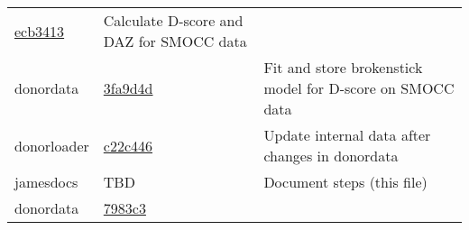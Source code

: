 \documentclass[]{book}
\begin{document}
\begin{longtable}[]{@{}lll@{}}
\begin{minipage}[t]{0.29\columnwidth}
\href{https://github.com/stefvanbuuren/donordata/commit/ecb3413b115c3193135b1af118597768b083dc41}{ecb3413}\strut
\end{minipage} & \begin{minipage}[t]{0.36\columnwidth}\raggedright
Calculate D-score and DAZ for SMOCC data\strut
\end{minipage}\tabularnewline
\begin{minipage}[t]{0.26\columnwidth}\raggedright
donordata\strut
\end{minipage} & \begin{minipage}[t]{0.29\columnwidth}\raggedright
\href{https://github.com/stefvanbuuren/donordata/commit/3fa9d4de347d09ccff32a887cf6bd8dadfdfaeb6}{3fa9d4d}\strut
\end{minipage} & \begin{minipage}[t]{0.36\columnwidth}\raggedright
Fit and store brokenstick model for D-score on SMOCC data\strut
\end{minipage}\tabularnewline
\begin{minipage}[t]{0.26\columnwidth}\raggedright
donorloader\strut
\end{minipage} & \begin{minipage}[t]{0.29\columnwidth}\raggedright
\href{https://github.com/stefvanbuuren/donorloader/commit/c22c44607b40ff6bda2009c25894362b68831275}{c22c446}\strut
\end{minipage} & \begin{minipage}[t]{0.36\columnwidth}\raggedright
Update internal data after changes in donordata\strut
\end{minipage}\tabularnewline
\begin{minipage}[t]{0.26\columnwidth}\raggedright
jamesdocs\strut
\end{minipage} & \begin{minipage}[t]{0.29\columnwidth}\raggedright
TBD\strut
\end{minipage} & \begin{minipage}[t]{0.36\columnwidth}\raggedright
Document steps (this file)\strut
\end{minipage}\tabularnewline
\begin{minipage}[t]{0.26\columnwidth}\raggedright
donordata\strut
\end{minipage} & \begin{minipage}[t]{0.29\columnwidth}\raggedright
\href{https://github.com/stefvanbuuren/donordata/commit/7983c3d81a69eb9c6b81a3e0f0668e892c5abf5a}{7983c3}\strut
\end{minipage} & \begin{minipage}[t]{0.36\columnwidth}\raggedright

\end{minipage}
\end{longtable}
\end{document}
